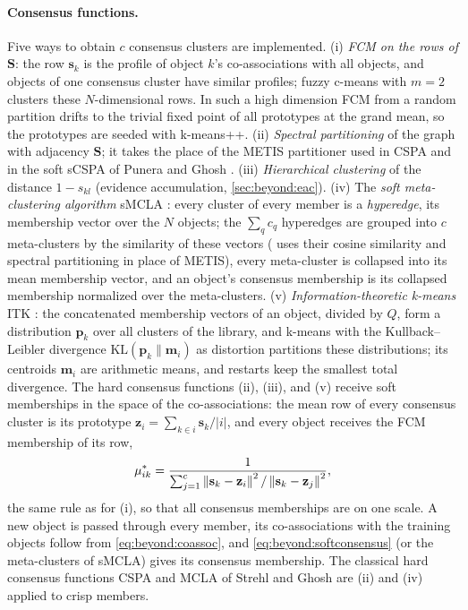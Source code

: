 \paragraph{Consensus functions.} Five ways to obtain $c$ consensus clusters are implemented. (i) \emph{FCM on the rows of $\mathbf{S}$}: the row $\mathbf{s}_k$ is the profile of object $k$'s co-associations with all objects, and objects of one consensus cluster have similar profiles; fuzzy c-means with $m=2$ clusters these $N$-dimensional rows. In such a high dimension FCM from a random partition drifts to the trivial fixed point of all prototypes at the grand mean, so the prototypes are seeded with k-means++. (ii) \emph{Spectral partitioning} \cite{ng:2002:spectral} of the graph with adjacency $\mathbf{S}$; it takes the place of the METIS partitioner \cite{karypis:1998:metis} used in CSPA and in the soft sCSPA of Punera and Ghosh \cite{punera:2008:soft}. (iii) \emph{Hierarchical clustering} of the distance $1-s_{kl}$ (evidence accumulation, \cref{sec:beyond:eac}). (iv) The \emph{soft meta-clustering algorithm} sMCLA \cite{punera:2008:soft}: every cluster of every member is a \emph{hyperedge}, its membership vector over the $N$ objects; the $\sum_q c_q$ hyperedges are grouped into $c$ meta-clusters by the similarity of these vectors ( uses their cosine similarity and spectral partitioning in place of METIS), every meta-cluster is collapsed into its mean membership vector, and an object's consensus membership is its collapsed membership normalized over the meta-clusters. (v) \emph{Information-theoretic k-means} ITK \cite{punera:2008:soft}: the concatenated membership vectors of an object, divided by $Q$, form a distribution $\mathbf{p}_k$ over all clusters of the library, and k-means with the Kullback--Leibler divergence $\mathrm{KL}(\mathbf{p}_k\|\mathbf{m}_i)$ as distortion partitions these distributions; its centroids $\mathbf{m}_i$ are arithmetic means, and restarts keep the smallest total divergence. The hard consensus functions (ii), (iii), and (v) receive soft memberships in the space of the co-associations: the mean row of every consensus cluster is its prototype $\mathbf{z}_i=\sum_{k\in i}\mathbf{s}_k/|i|$, and every object receives the FCM membership of its row,
\begin{equation}
  \mu^{*}_{ik}=\frac{1}{\sum_{j=1}^{c}\left\lVert \mathbf{s}_k-\mathbf{z}_i \right\rVert^2/\left\lVert \mathbf{s}_k-\mathbf{z}_j \right\rVert^2},
  \label{eq:beyond:softconsensus}
\end{equation}
the same rule as for (i), so that all consensus memberships are on one scale. A new object is passed through every member, its co-associations with the training objects follow from \eqref{eq:beyond:coassoc}, and \eqref{eq:beyond:softconsensus} (or the meta-clusters of sMCLA) gives its consensus membership. The classical hard consensus functions CSPA and MCLA of Strehl and Ghosh are (ii) and (iv) applied to crisp members.

